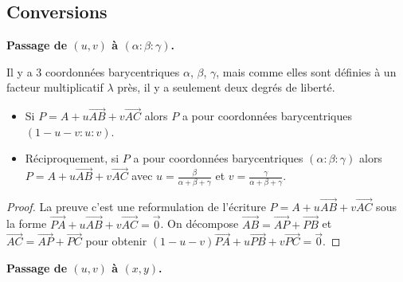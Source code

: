 \documentclass[11pt,class=report,crop=false]{standalone}
\begin{document}
\subsection{Conversions}
\medskip
\textbf{Passage de $(u,v)$ à $(\alpha:\beta:\gamma)$.}

Il y a $3$ coordonnées barycentriques $\alpha$, $\beta$, $\gamma$, mais comme elles sont définies à un facteur multiplicatif $\lambda$ près, il y a seulement deux degrés de liberté.

\begin{proposition}
	\sauteligne
	\begin{itemize}
		\item Si $P = A +  u \vec{AB} + v \vec{AC}$ alors $P$ a pour coordonnées barycentriques $(1-u-v:u:v)$.
		\item Réciproquement, si $P$ a pour coordonnées barycentriques $(\alpha:\beta:\gamma)$ alors 
		$P = A +  u \vec{AB} + v \vec{AC}$ avec $u = \frac{\beta}{\alpha+\beta+\gamma}$ et $v = \frac{\gamma}{\alpha+\beta+\gamma}$.
	\end{itemize}
\end{proposition}

\begin{proof}
La preuve c'est une reformulation de l'écriture $P = A +  u \vec{AB} + v \vec{AC}$ sous la forme
$\vec{PA} + u \vec{AB} + v \vec{AC} = \vec{0}$.
On décompose $\vec{AB} = \vec{AP} + \vec{PB}$ et $\vec{AC} = \vec{AP} + \vec{PC}$ pour obtenir
$(1-u-v)\vec{PA} + u \vec{PB} + v \vec{PC} = \vec{0}$.
\end{proof}


\medskip
\textbf{Passage de $(u,v)$ à $(x,y)$.}
\end{document}

